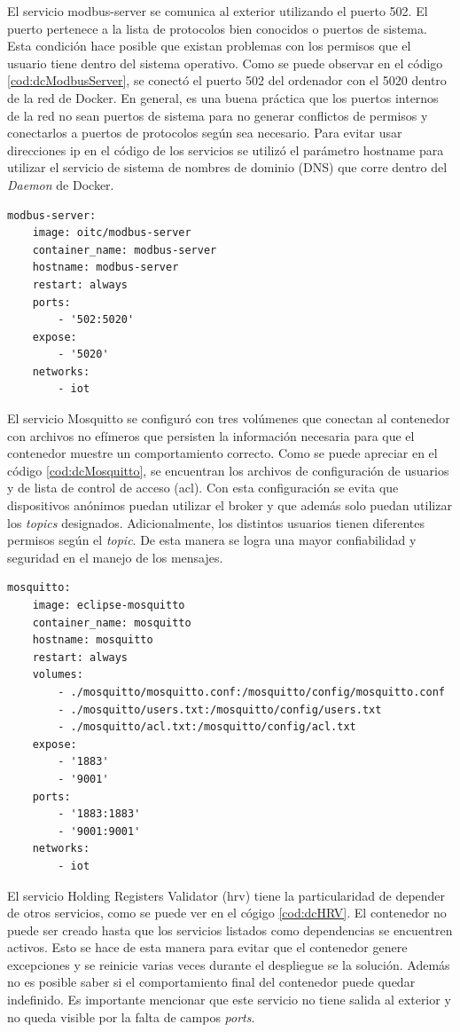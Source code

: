 El servicio modbus-server se comunica al exterior utilizando el puerto 502.
El puerto pertenece a la lista de protocolos bien conocidos o puertos de sistema.
Esta condición hace posible que existan problemas con los permisos que el usuario tiene dentro del sistema operativo.
Como se puede observar en el código \ref{cod:dcModbusServer}, se conectó el puerto 502 del ordenador con el 5020 dentro de la red de Docker.
En general, es una buena práctica que los puertos internos de la red no sean puertos de sistema para no generar conflictos de permisos y conectarlos a puertos de protocolos según sea necesario.
Para evitar usar direcciones ip en el código de los servicios se utilizó el parámetro hostname para utilizar el servicio de sistema de nombres de dominio (DNS) que corre dentro del \emph{Daemon} de Docker.

\begin{lstlisting}[label=cod:dcModbusServer,caption=Orquestación del servidor Modbus.]
modbus-server:
	image: oitc/modbus-server
	container_name: modbus-server
	hostname: modbus-server
	restart: always
	ports:
		- '502:5020'
	expose: 
    	- '5020'
	networks: 
		- iot
\end{lstlisting}

El servicio Mosquitto se configuró con tres volúmenes que conectan al contenedor con archivos no efímeros que persisten la información necesaria para que el contenedor muestre un comportamiento correcto.
Como se puede apreciar en el código \ref{cod:dcMosquitto}, se encuentran los archivos de configuración de usuarios y de lista de control de acceso (acl).
Con esta configuración se evita que dispositivos anónimos puedan utilizar el broker y que además solo puedan utilizar los \emph{topics} designados.
Adicionalmente, los distintos usuarios tienen diferentes permisos según el \emph{topic}.
De esta manera se logra una mayor confiabilidad y seguridad en el manejo de los mensajes.

\begin{lstlisting}[label=cod:dcMosquitto,caption=Orquestación del broker Mosquitto.]
mosquitto:
	image: eclipse-mosquitto
	container_name: mosquitto
	hostname: mosquitto
	restart: always
	volumes: 
		- ./mosquitto/mosquitto.conf:/mosquitto/config/mosquitto.conf
		- ./mosquitto/users.txt:/mosquitto/config/users.txt
		- ./mosquitto/acl.txt:/mosquitto/config/acl.txt
	expose: 
		- '1883'
		- '9001'
	ports: 
		- '1883:1883'
		- '9001:9001'
	networks: 
		- iot
\end{lstlisting}

El servicio Holding Registers Validator (hrv) tiene la particularidad de depender de otros servicios, como se puede ver en el cógigo \ref{cod:dcHRV}.
El contenedor no puede ser creado hasta que los servicios listados como dependencias se encuentren activos.
Esto se hace de esta manera para evitar que el contenedor genere excepciones y se reinicie varias veces durante el despliegue se la solución.
Además no es posible saber si el comportamiento final del contenedor puede quedar indefinido.
Es importante mencionar que este servicio no tiene salida al exterior y no queda visible por la falta de campos \emph{ports}.

